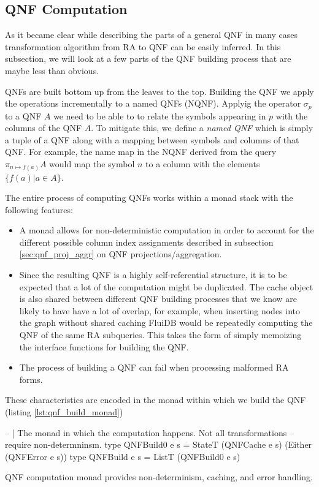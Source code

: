 \subsection{QNF Computation}
\label{sec:building_qnfs}

As it became clear while describing the parts of a general QNF in many
cases transformation algorithm from RA to QNF can be easily
inferred. In this subsection, we will look at a few parts of the QNF
building process that are maybe less than obvious.

QNFs are built bottom up from the leaves to the top.  Building the QNF
we apply the operations incrementally to a named QNFs (NQNF).  Applyig
the operator \(\sigma_p\) to a QNF \(A\) we need to be able to to
relate the symbols appearing in \(p\) with the columns of the QNF
\(A\). To mitigate this, we define a \emph{named QNF} which is simply a
tuple of a QNF along with a mapping between symbols and columns of
that QNF.  For example, the name map in the NQNF derived from the
query \(\pi_{n \mapsto f(a)} A\) would map the symbol \(n\) to a
column with the elements \(\{f(a) | a \in A\}\).

The entire process of computing QNFs works within a monad stack with
the following features:

\begin{itemize}
\item A  monad allows for non-deterministic computation in
  order to account for the different possible column index assignments
  described in subsection \ref{sec:qnf_proj_aggr} on QNF
  projections/aggregation.
\item Since the resulting QNF is a highly self-referential structure,
  it is to be expected that a lot of the computation might be
  duplicated. The cache object is also shared between different QNF
  building processes that we know are likely to have have a lot of
  overlap, for example, when inserting nodes into the graph without
  shared caching FluiDB would be repeatedly computing the QNF of the
  same RA subqueries. This takes the form of simply memoizing the
  interface functions for building the QNF.
\item The process of building a QNF can fail when processing malformed
  RA forms.
\end{itemize}

These characteristics are encoded in the monad within which we build
the QNF (listing \ref{lst:qnf_build_monad})

\begin{code}
  \begin{haskellcode}
    -- | The monad in which the computation happens. Not all transformations
    -- require non-determninsm.
    type QNFBuild0 e s = StateT (QNFCache e s) (Either (QNFError e s))
    type QNFBuild e s = ListT (QNFBuild0 e s)
  \end{haskellcode}
  \caption{\label{lst:qnf_build_monad}QNF computation monad provides
    non-determinism, caching, and error handling.}
\end{code}

